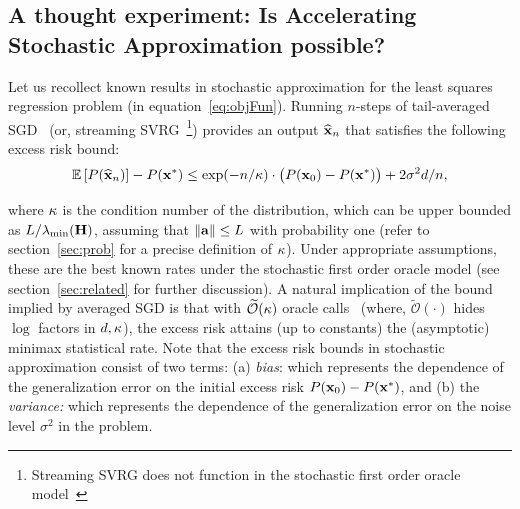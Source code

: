 \subsection{A thought experiment: Is Accelerating Stochastic Approximation possible?}\label{sec:exp}
Let us recollect known results in stochastic approximation for the least squares regression problem (in equation~\ref{eq:objFun}). Running $n$-steps of tail-averaged SGD~\citep{JainKKNS16} (or, streaming SVRG~\citep{FrostigGKS15}\footnote{Streaming SVRG does not function in the stochastic first order oracle model~\citep{FrostigGKS15}}) provides an output $\widehat{\mathbf{x}}_n$ that satisfies the following excess risk bound:
\vspace{-0.3cm}
\begin{align} \label{eq:sgd_rate}
\mathbb{E}\left[P(\widehat{\mathbf{x}}_n)\right]-P(\mathbf{x}^*)\leq \exp(-n/{\kappa}) \cdot \big(P(\mathbf{x}_0)-P(\mathbf{x}^*)\big) + 2\sigma^2d/n,
\end{align}

\vspace{-0.3cm}
\noindent where ${\kappa}$ is the condition number
of the distribution, which can be upper bounded as $L/\lambda_{\textrm{min}}(\mathbf{H})$,
assuming that $\|\mathbf{a}\|\leq L$ with probability one (refer to
section~\ref{sec:prob} for a precise definition of ${\kappa}$).  Under appropriate
assumptions, these are the best known rates under the stochastic first
order oracle model (see section~\ref{sec:related} for further discussion).
  A natural implication of the bound implied by averaged SGD is that with $\widetilde{\mathcal{O}}({\kappa})$ oracle
calls~\citep{JainKKNS16} (where, $\widetilde{\mathcal{O}}(\cdot)$ hides $\log$ factors in $d,{\kappa}$), the excess risk attains (up to
constants) the (asymptotic) minimax statistical rate. Note that the excess
risk bounds in stochastic approximation consist of two terms:
(a) {\em bias}: which represents the dependence of the generalization
error on the initial excess risk $P(\mathbf{x}_0)-P(\mathbf{x}^*)$, and (b) the {\em
  variance:} which represents the dependence of the generalization
error on the noise level $\sigma^2$ in the problem.

